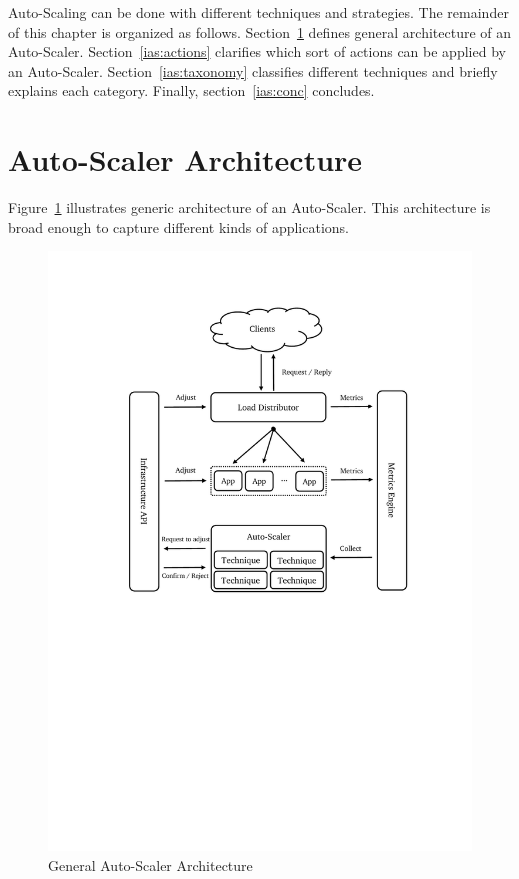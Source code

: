 Auto-Scaling can be done with different techniques and strategies. The remainder of this chapter is organized as follows. Section~\ref{ias:arch} defines general architecture of an Auto-Scaler. Section~\ref{ias:actions} clarifies which sort of actions can be applied by an Auto-Scaler. Section~\ref{ias:taxonomy} classifies different techniques and briefly explains each category. Finally, section~\ref{ias:conc} concludes.

\section{Auto-Scaler Architecture}
\label{ias:arch}

Figure~\ref{fig:auto-scaler-arch} illustrates generic architecture of an Auto-Scaler. This architecture is broad enough to capture different kinds of applications.
\begin{figure}[h]
    \centering
    \includegraphics[clip, trim=3cm 12.5cm 2.5cm 2.5cm]{auto-scaler-arch.pdf}
    \caption{General Auto-Scaler Architecture}
    \label{fig:auto-scaler-arch}
\end{figure}
